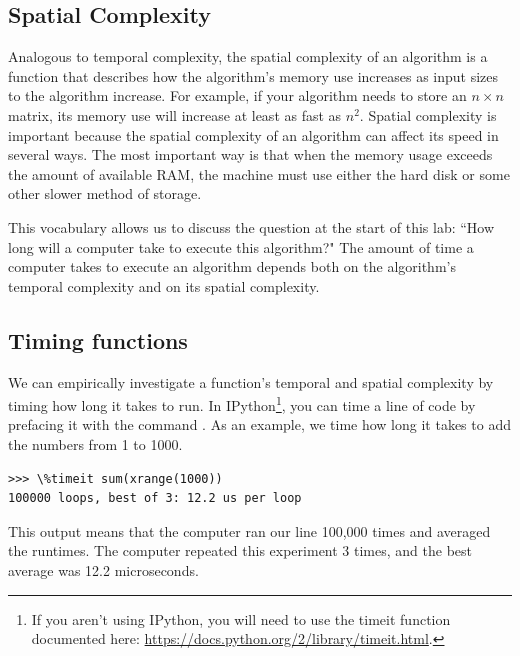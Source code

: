 \subsection*{Spatial Complexity}
Analogous to temporal complexity, the spatial complexity of an algorithm is a function that describes how the algorithm's memory use increases as input sizes to the algorithm increase. For example, if your algorithm needs to store an $n \times n$ matrix, its memory use will increase at least as fast as $n^2$. Spatial complexity is important because  the spatial complexity of an algorithm can affect its speed in several ways. The most important way is that when the memory usage exceeds the amount of available RAM, the machine must use either the hard disk or some other slower method of storage.

This vocabulary allows us to discuss the question at the start of this lab: ``How long will a computer take to execute this algorithm?" The amount of time a computer takes to execute an algorithm depends both on the algorithm's temporal complexity and on its spatial complexity. 

\subsection*{Timing functions}
We can empirically investigate a function's temporal and spatial complexity by timing how long it takes to run.
In IPython\footnote{If you aren't using IPython, you will need
to use the timeit function documented here: \url{https://docs.python.org/2/library/timeit.html}.}, you can time a line of code by prefacing it with the command .
As an example, we time how long it takes to add the numbers from 1 to 1000.
\begin{lstlisting}
>>> \%timeit sum(xrange(1000))
100000 loops, best of 3: 12.2 us per loop
\end{lstlisting}
This output means that the computer ran our line 100,000 times and averaged the runtimes.
The computer repeated this experiment 3 times, and the best average was 12.2 microseconds.

